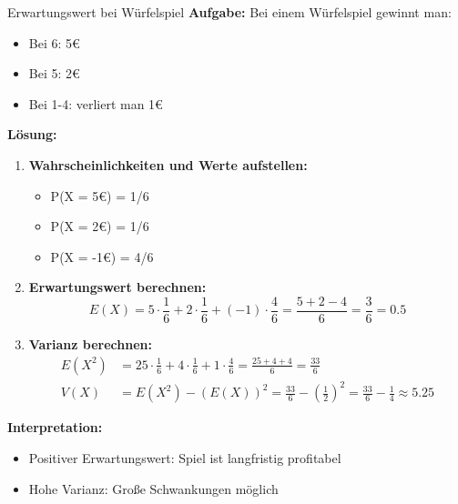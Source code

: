 \begin{example2}{Erwartungswert bei Würfelspiel}
\textbf{Aufgabe:} Bei einem Würfelspiel gewinnt man:
\begin{itemize}
\item Bei 6: 5€
\item Bei 5: 2€
\item Bei 1-4: verliert man 1€
\end{itemize}

\textbf{Lösung:}
\begin{enumerate}
\item \textbf{Wahrscheinlichkeiten und Werte aufstellen:}
   \begin{itemize}
   \item P(X = 5€) = 1/6
   \item P(X = 2€) = 1/6
   \item P(X = -1€) = 4/6
   \end{itemize}

\item \textbf{Erwartungswert berechnen:}
   $$E(X) = 5 \cdot \frac{1}{6} + 2 \cdot \frac{1}{6} + (-1) \cdot \frac{4}{6} = \frac{5+2-4}{6} = \frac{3}{6} = 0.5$$

\item \textbf{Varianz berechnen:}
   \begin{align*}
   E(X^2) &= 25 \cdot \frac{1}{6} + 4 \cdot \frac{1}{6} + 1 \cdot \frac{4}{6} = \frac{25+4+4}{6} = \frac{33}{6} \\
   V(X) &= E(X^2) - (E(X))^2 = \frac{33}{6} - (\frac{1}{2})^2 = \frac{33}{6} - \frac{1}{4} \approx 5.25
   \end{align*}
\end{enumerate}

\textbf{Interpretation:}
\begin{itemize}
\item Positiver Erwartungswert: Spiel ist langfristig profitabel
\item Hohe Varianz: Große Schwankungen möglich
\end{itemize}
\end{example2}

